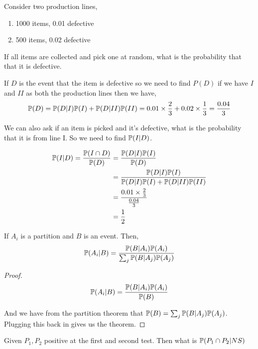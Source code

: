 \begin{eg}
    Consider two production lines,
    \begin{enumerate}
        \item 1000 items, 0.01 defective
        \item 500 items, 0.02 defective
    \end{enumerate}

    If all items are collected and pick one at random, what is the probability that that it is defective. 

    If $D$ is the event that the item is defective so we need to find  $P(D)$ if we have  $I$ and $II$ as both the production lines then we have,  
    $$ \P(D) = \P(D | I) \P(I) + \P(D | II) \P(II)  = 0.01 \times \frac{2}{3} + 0.02 \times  \frac{1}{3} = \frac{0.04}{3}$$ 



    We can also ask if an item is picked and it's defective, what is the probability that it is from line I. So we need to find $\P(I | D)$.

     
    \begin{align*}
        \P(I | D) = \frac{\P(I \cap D)}{\P(D)} &= \frac{\P(D | I) \P(I)}{\P(D)}\\
                                               &= \frac{\P(D | I) \P(I)}{\P(D | I) \P(I) + \P(D | II) \P(II)}\\
                                               &= \frac{0.01 \times  \frac{2}{3}}{\frac{0.04}{3}}\\
                                               &= \frac{1}{2}
    \end{align*}
\end{eg}


\begin{theorem}
    If $A_i$   is a partition and $B$ is an event. Then, 
    $$ \P(A_i | B) = \frac{\P(B | A_i) \P(A_i)}{\sum_j \P(B | A_j) \P(A_j)} $$ 
\end{theorem}
\begin{proof}
    \begin{align*}
        \P(A_i | B) &= \frac{\P(B | A_i) \P(A_i)}{\P(B)}\\
    \end{align*}

    And we have from the partition theorem that  $\P(B) = \sum_j \P(B | A_j) \P(A_j)$. Plugging this back in gives us the theorem.
\end{proof}



Given $P_1, P_2$ positive at the first and second test. Then what is $\P(P_1 \cap P_2 | NS)$
